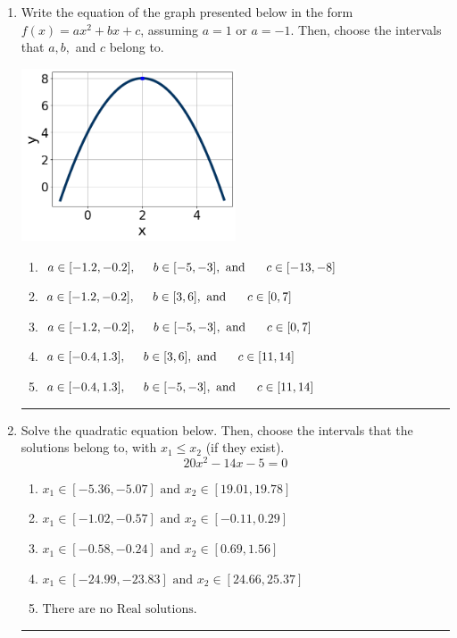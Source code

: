 \documentclass[14pt]{extbook}
\newcommand{\litem}[1]{\item#1\hspace*{-1cm}\rule{\textwidth}{0.4pt}}
\begin{document}
\begin{enumerate}
{\begin{enumerate}[label=\Alph*.]
\end{enumerate} }
\litem{
Write the equation of the graph presented below in the form $f(x)=ax^2+bx+c$, assuming  $a=1$ or $a=-1$. Then, choose the intervals that $a, b,$ and $c$ belong to.
\begin{center}
    \includegraphics[width=0.5\textwidth]{../Figures/quadraticGraphToEquationCopyA.png}
\end{center}
\begin{enumerate}[label=\Alph*.]
\item \( a \in [-1.2, -0.2], \hspace*{5mm} b \in [-5, -3], \text{ and } \hspace*{5mm} c \in [-13, -8] \)
\item \( a \in [-1.2, -0.2], \hspace*{5mm} b \in [3, 6], \text{ and } \hspace*{5mm} c \in [0, 7] \)
\item \( a \in [-1.2, -0.2], \hspace*{5mm} b \in [-5, -3], \text{ and } \hspace*{5mm} c \in [0, 7] \)
\item \( a \in [-0.4, 1.3], \hspace*{5mm} b \in [3, 6], \text{ and } \hspace*{5mm} c \in [11, 14] \)
\item \( a \in [-0.4, 1.3], \hspace*{5mm} b \in [-5, -3], \text{ and } \hspace*{5mm} c \in [11, 14] \)

\end{enumerate} }
\litem{
Solve the quadratic equation below. Then, choose the intervals that the solutions belong to, with $x_1 \leq x_2$ (if they exist).\[ 20x^{2} -14 x -5 = 0 \]\begin{enumerate}[label=\Alph*.]
\item \( x_1 \in [-5.36, -5.07] \text{ and } x_2 \in [19.01, 19.78] \)
\item \( x_1 \in [-1.02, -0.57] \text{ and } x_2 \in [-0.11, 0.29] \)
\item \( x_1 \in [-0.58, -0.24] \text{ and } x_2 \in [0.69, 1.56] \)
\item \( x_1 \in [-24.99, -23.83] \text{ and } x_2 \in [24.66, 25.37] \)
\item \( \text{There are no Real solutions.} \)

\end{enumerate} }
\end{enumerate}
\end{document}
